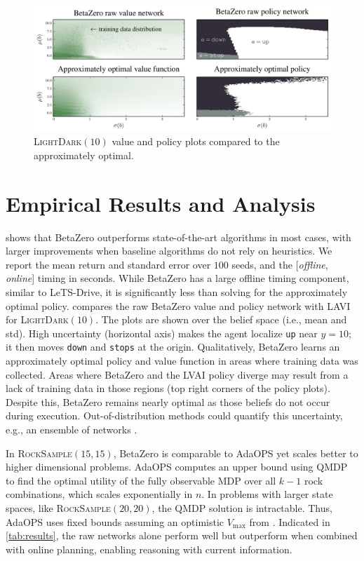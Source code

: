 \begin{figure}[b!]
    \centering
    \includegraphics[width=\linewidth]{figures/betazero/results/value_and_policy_plot.pdf}
    \caption{\textsc{LightDark}$(10)$ value and policy plots compared to the approximately optimal.}
    \label{fig:lightdark_value_policy}
\end{figure}


\section{Empirical Results and Analysis}
 shows that BetaZero outperforms state-of-the-art algorithms in most cases, with larger improvements when baseline algorithms do not rely on heuristics.
We report the mean return and standard error over $100$ seeds, and the [\textit{offline}, \textit{online}] timing in seconds.
While BetaZero has a large offline timing component, similar to LeTS-Drive, it is significantly less than solving for the approximately optimal policy.
 compares the raw BetaZero value and policy network with LAVI for \textsc{LightDark}$(10)$.
The plots are shown over the belief space (i.e., mean and std).
High uncertainty (horizontal axis) makes the agent localize \texttt{up} near $y=10$; it then moves \texttt{down} and \texttt{stops} at the origin.
Qualitatively, BetaZero learns an approximately optimal policy and value function in areas where training data was collected.
Areas where BetaZero and the LVAI policy diverge may result from a lack of training data in those regions (top right corners of the policy plots).
Despite this, BetaZero remains nearly optimal as those beliefs do not occur during execution.
Out-of-distribution methods could quantify this uncertainty, e.g., an ensemble of networks \cite{salehi2022unified}.


In \textsc{RockSample}$(15,15)$, BetaZero is comparable to AdaOPS yet scales better to higher dimensional problems.
AdaOPS computes an upper bound using QMDP \cite{littman1995learning} to find the optimal utility of the fully observable MDP over all ${k-1}$ rock combinations, which scales exponentially in $n$.
In problems with larger state spaces, like \textsc{RockSample}$(20,20)$, the QMDP solution is intractable.
Thus, AdaOPS uses fixed bounds assuming an optimistic $V_\text{max}$ 
from \textcite{adaops2021review}.
Indicated in \cref{tab:results}, the raw networks alone perform well but outperform when combined with online planning, enabling reasoning with current information.


